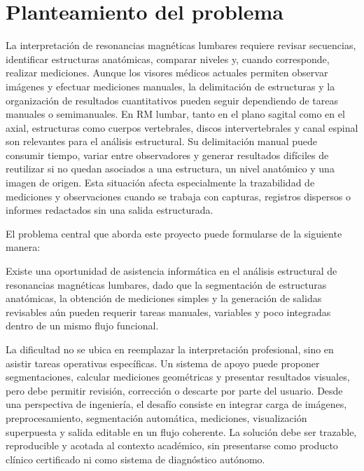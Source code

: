 \chapter{Planteamiento del problema}

La interpretación de resonancias magnéticas lumbares requiere revisar secuencias, identificar estructuras anatómicas, comparar niveles y, cuando corresponde, realizar mediciones. Aunque los visores médicos actuales permiten observar imágenes y efectuar mediciones manuales, la delimitación de estructuras y la organización de resultados cuantitativos pueden seguir dependiendo de tareas manuales o semimanuales. En RM lumbar, tanto en el plano sagital como en el axial, estructuras como cuerpos vertebrales, discos intervertebrales y canal espinal son relevantes para el análisis estructural. Su delimitación manual puede consumir tiempo, variar entre observadores y generar resultados difíciles de reutilizar si no quedan asociados a una estructura, un nivel anatómico y una imagen de origen. Esta situación afecta especialmente la trazabilidad de mediciones y observaciones cuando se trabaja con capturas, registros dispersos o informes redactados sin una salida estructurada.

El problema central que aborda este proyecto puede formularse de la siguiente manera:

Existe una oportunidad de asistencia informática en el análisis estructural de resonancias magnéticas lumbares, dado que la segmentación de estructuras anatómicas, la obtención de mediciones simples y la generación de salidas revisables aún pueden requerir tareas manuales, variables y poco integradas dentro de un mismo flujo funcional.

La dificultad no se ubica en reemplazar la interpretación profesional, sino en asistir tareas operativas específicas. Un sistema de apoyo puede proponer segmentaciones, calcular mediciones geométricas y presentar resultados visuales, pero debe permitir revisión, corrección o descarte por parte del usuario. Desde una perspectiva de ingeniería, el desafío consiste en integrar carga de imágenes, preprocesamiento, segmentación automática, mediciones, visualización superpuesta y salida editable en un flujo coherente. La solución debe ser trazable, reproducible y acotada al contexto académico, sin presentarse como producto clínico certificado ni como sistema de diagnóstico autónomo.
